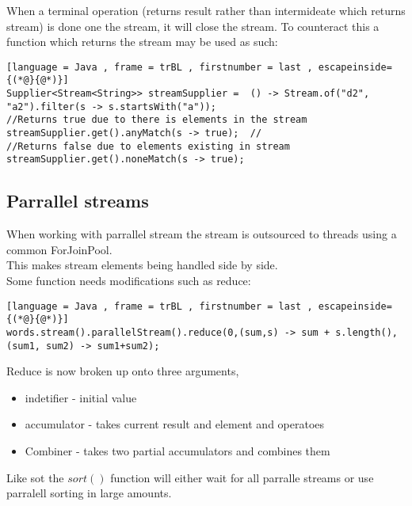 \documentclass[12pt, a4paper]{article}
\begin{document}
		When a terminal operation (returns result rather than intermideate which returns stream) is done one the stream, it will close the stream. To counteract this a function which returns the stream may be used as such:
	\begin{lstlisting}[language = Java , frame = trBL , firstnumber = last , escapeinside={(*@}{@*)}]
Supplier<Stream<String>> streamSupplier =  () -> Stream.of("d2", "a2").filter(s -> s.startsWith("a"));
//Returns true due to there is elements in the stream
streamSupplier.get().anyMatch(s -> true);  //
//Returns false due to elements existing in stream
streamSupplier.get().noneMatch(s -> true); 
\end{lstlisting}	
	\subsection{Parrallel streams}
		When working with parrallel stream the stream is outsourced to threads using a common ForJoinPool.\\
		This makes stream elements being handled side by side.\\
		Some function needs modifications such as reduce:
\begin{lstlisting}[language = Java , frame = trBL , firstnumber = last , escapeinside={(*@}{@*)}]
words.stream().parallelStream().reduce(0,(sum,s) -> sum + s.length(), (sum1, sum2) -> sum1+sum2);
\end{lstlisting}		
	Reduce is now broken up onto three arguments,
	\begin{itemize}
		\item indetifier - initial value
		\item accumulator - takes current result and element and operatoes
		\item Combiner - takes two partial accumulators and combines them
	\end{itemize}
	Like sot the $sort()$ function will either wait for all parralle streams or use parralell sorting in large amounts.
\end{document}

